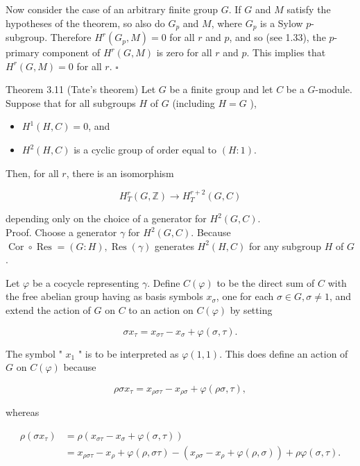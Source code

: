 \documentclass[10pt]{article}
\begin{document}
Now consider the case of an arbitrary finite group $G$. If $G$ and $M$ satisfy the hypotheses of the theorem, so also do $G_{p}$ and $M$, where $G_{p}$ is a Sylow $p$-subgroup. Therefore $H^{r}\left(G_{p}, M\right)=0$ for all $r$ and $p$, and so (see 1.33), the $p$-primary component of $H^{r}(G, M)$ is zero for all $r$ and $p$. This implies that $H^{r}(G, M)=0$ for all $r$. \(\square\)

Theorem 3.11 (Tate's theorem) Let $G$ be a finite group and let $C$ be a $G$-module. Suppose that for all subgroups $H$ of $G$ (including $H=G$ ),

\begin{itemize}
  \item[(a)] $H^{1}(H, C)=0$, and
  \item[(b)] $H^{2}(H, C)$ is a cyclic group of order equal to $(H: 1)$.
\end{itemize}

Then, for all $r$, there is an isomorphism

$$
H_{T}^{r}(G, \mathbb{Z}) \rightarrow H_{T}^{r+2}(G, C)
$$

depending only on the choice of a generator for $H^{2}(G, C)$.\\
Proof. Choose a generator $\gamma$ for $H^{2}(G, C)$. Because $\operatorname{Cor} \circ \operatorname{Res}=(G: H), \operatorname{Res}(\gamma)$ generates $H^{2}(H, C)$ for any subgroup $H$ of $G$.

Let $\varphi$ be a cocycle representing $\gamma$. Define $C(\varphi)$ to be the direct sum of $C$ with the free abelian group having as basis symbols $x_{\sigma}$, one for each $\sigma \in G, \sigma \neq 1$, and extend the action of $G$ on $C$ to an action on $C(\varphi)$ by setting

$$
\sigma x_{\tau}=x_{\sigma \tau}-x_{\sigma}+\varphi(\sigma, \tau) .
$$

The symbol " $x_{1}$ " is to be interpreted as $\varphi(1,1)$. This does define an action of $G$ on $C(\varphi)$ because

$$
\rho \sigma x_{\tau}=x_{\rho \sigma \tau}-x_{\rho \sigma}+\varphi(\rho \sigma, \tau),
$$

whereas

$$
\begin{aligned}
\rho\left(\sigma x_{\tau}\right) & =\rho\left(x_{\sigma \tau}-x_{\sigma}+\varphi(\sigma, \tau)\right) \\
& =x_{\rho \sigma \tau}-x_{\rho}+\varphi(\rho, \sigma \tau)-\left(x_{\rho \sigma}-x_{\rho}+\varphi(\rho, \sigma)\right)+\rho \varphi(\sigma, \tau) .
\end{aligned}
$$
\end{document}
